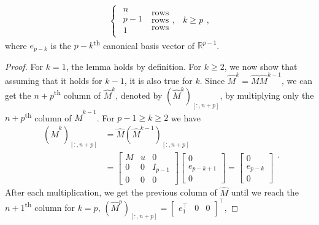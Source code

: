 \begin{mdframed}
\begin{lemma}
\begin{equation*}
\begin{cases}
                \begin{matrix} n \\ p-1 \\ 1 \end{matrix}
                \; \begin{matrix} \text{rows} \\ \text{rows} \\ \text{rows} \end{matrix},
                & k \ge p
            \end{cases},
        \end{equation*}
        where $e_{p-k}$ is the $p-k$\textsuperscript{th} canonical basis vector of $\mathbb{R}^{p-1}$.
    \end{lemma}
\end{mdframed}
\begin{proof}
    For $k=1$, the lemma holds by definition. For $k \ge 2$, we now show that assuming
    that it holds for $k-1$, it is also true for $k$.
    Since $\hat{M}^k = \hat{M} \hat{M}^{k-1}$, we can get the $n+p$\textsuperscript{th}
    column of $\hat{M}^k$, denoted by $(\hat{M}^k)_{[:, n+p]}$, by multiplying only
    the $n+p$\textsuperscript{th} column of $\hat{M}^{k-1}$.
    For $p-1 \ge k \ge 2$ we have
    \begin{equation*}
        \begin{aligned}
            (\hat{M}^k)_{[:, n+p]} & = \hat{M} (\hat{M}^{k-1})_{[:, n+p]} \\
            & =
            \begin{bmatrix} M & u & 0\\ 0 & 0 & I_{p-1}\\ 0 & 0 & 0 \end{bmatrix}
            \begin{bmatrix} 0 \\ e_{p-k+1} \\ 0 \end{bmatrix}
            =
            \begin{bmatrix} 0 \\ e_{p-k} \\ 0 \end{bmatrix}
        \end{aligned}.
    \end{equation*}
    After each multiplication, we get the previous column of $\hat{M}$ until we reach
    the $n+1$\textsuperscript{th} column for $k=p$,
    $(\hat{M}^p)_{[:, n+p]} = \begin{bmatrix}e_1^\top & 0 & 0\end{bmatrix}^\top$,

\end{proof}
